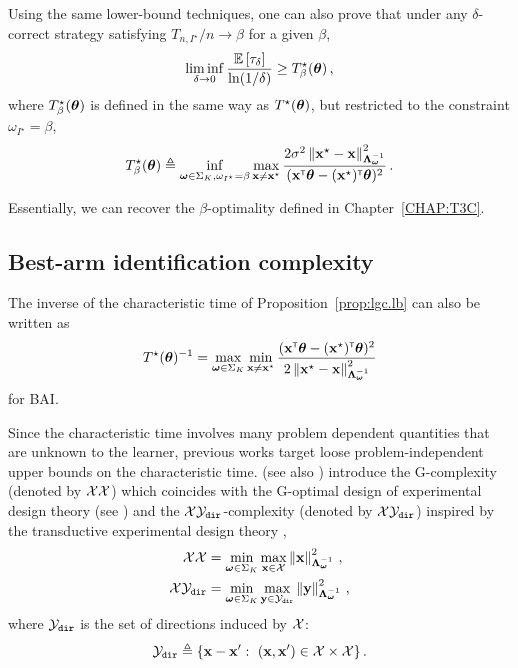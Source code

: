 \begin{remark}
\begin{leftbar}[remarkbar]
Using the same lower-bound techniques, one can also prove that under any $\delta$-correct strategy satisfying $T_{n,I^\star}/n \rightarrow \beta$ for a given $\beta$,
\[
    \liminf_{\delta \rightarrow 0}\frac{\mathbb{E}\left[\tau_\delta\right]}{\ln(1/\delta)} \geq T^\star_\beta({\boldsymbol \theta})\,,
\]
where $T^\star_\beta({\boldsymbol \theta})$ is defined in the same way as $T^\star({\boldsymbol \theta})$, but restricted to the constraint $\omega_{I^\star}=\beta$,
\[
    T^\star_{\beta}({\boldsymbol \theta}) \triangleq \inf_{{\boldsymbol \omega}\in\Sigma_K,\omega_{I^\star}=\beta}\max_{{\bf x}\neq {\bf x}^\star} \frac{2\sigma^2\left\lVert{\bf x}^\star - {\bf x}\right\rVert^2_{{\boldsymbol \Lambda}_{{\boldsymbol \omega}}^{-1}}}{({\bf x}^\mathsf{\scriptscriptstyle T}{\boldsymbol \theta}-({\bf x}^\star)^\mathsf{\scriptscriptstyle T}{\boldsymbol \theta})^2}\,.
\]


Essentially, we can recover the $\beta$-optimality defined in Chapter~\ref{CHAP:T3C}.
\end{leftbar}
\end{remark}

\subsection{Best-arm identification complexity}\label{sec:lgc.complexity.complexity}

The inverse of the characteristic time of Proposition~\ref{prop:lgc.lb} can also be written as
\[
    T^{\star}({\boldsymbol \theta})^{-1} = \max_{{\boldsymbol \omega}\in\Sigma_K} \min_{{\bf x}\neq {\bf x}^\star} \frac{({\bf x}^\mathsf{\scriptscriptstyle T}{\boldsymbol \theta}-({\bf x}^\star)^\mathsf{\scriptscriptstyle T}{\boldsymbol \theta})^2}{2\left\lVert{\bf x}^\star - {\bf x}\right\rVert^2_{{\boldsymbol \Lambda}_{{\boldsymbol \omega}}^{-1}}}
\]
for BAI.

Since the characteristic time involves many problem dependent quantities that are unknown to the learner, previous works target loose problem-independent upper bounds on the characteristic time. \citet{soare2014linear} (see also \citealt{tao2018alba,fiez2019transductive}) introduce the G-complexity (denoted by $\mathcal{X}\mathcal{X}$) which coincides with the G-optimal design of experimental design theory (see \citealt{pukelsheim2006optimal}) and the $\mathcal{X}\mathcal{Y}_{\texttt{dir}}$-complexity (denoted by $\mathcal{X}\mathcal{Y}_{\texttt{dir}}$) inspired by the transductive experimental design theory  \citep{yu2006active},
\begin{align*}
    \mathcal{X}\mathcal{X} &=\min_{{\boldsymbol \omega}\in\Sigma_K} \max_{{\bf x}\in\mathcal{X}} \left\lVert{\bf x}\right\rVert_{{\boldsymbol \Lambda}_{{\boldsymbol \omega}}^{-1}}^2\,,\\
    \mathcal{X}\mathcal{Y}_{\texttt{dir}} &=\min_{{\boldsymbol \omega}\in\Sigma_K} \max_{{\bf y}\in\mathcal{Y}_{\texttt{dir}}} \left\lVert{\bf y}\right\rVert_{{\boldsymbol \Lambda}_{{\boldsymbol \omega}}^{-1}}^2\,,
\end{align*}
where $\mathcal{Y}_{\texttt{dir}}$ is the set of directions induced by $\mathcal{X}$:
\[
\cY_{\texttt{dir}}\eqdef\{\bx-\bx':\ (\bx,\bx')\in\cX\times\cX\}\,.
\]

